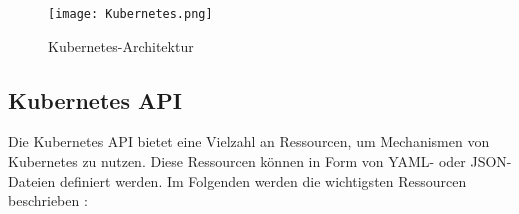 \begin{figure}[H]
	\begin{center}
		\texttt{[image: Kubernetes.png]}
		\caption[Kubernetes Architektur]{Kubernetes-Architektur \cite{LearnOpenShift}}
		\label{fig:KubernetesArchitektur}
	\end{center}
\end{figure}

\subsection{Kubernetes API}
Die Kubernetes API bietet eine Vielzahl an Ressourcen, um Mechanismen von Kubernetes zu nutzen. Diese Ressourcen können in Form von YAML- oder JSON-Dateien definiert werden. Im Folgenden werden die wichtigsten Ressourcen beschrieben \cite{LearnOpenShift}:

